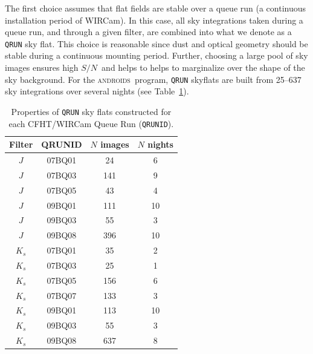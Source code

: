 \documentclass[iop]{emulateapj}
\newcommand{\sn}{\ensuremath{S/N}} %
\newcommand{\androids}{\textsc{androids}}
\newcommand{\Tab}[1]{Table~\ref{tab:#1}}  %
\begin{document}
The first choice assumes that flat fields are stable over a queue run (a continuous installation period of WIRCam).
In this case, all sky integrations taken during a queue run, and through a given filter, are combined into what we denote as a \texttt{QRUN} sky flat.
This choice is reasonable since dust and optical geometry should be stable during a continuous mounting period.
Further, choosing a large pool of sky images ensures high \sn\, and helps to helps to marginalize over the shape of the sky background.
For the \androids\ program, \texttt{QRUN} skyflats are built from 25--637 sky integrations over several nights (see \Tab{qrunflattable}).

\begin{table}[t]
\centering
\caption{Properties of \texttt{QRUN} sky flats constructed for each CFHT/WIRCam Queue Run (\texttt{QRUNID}).}
\label{tab:qrunflattable}

\begin{tabular}{cccc}
\hline
Filter & QRUNID & $N$ images & $N$ nights \\
\hline
$J$ & 07BQ01 & 24 & 6 \\
$J$ & 07BQ03 & 141 & 9 \\
$J$ & 07BQ05 & 43 & 4 \\
$J$ & 09BQ01 & 111 & 10 \\
$J$ & 09BQ03 & 55 & 3 \\
$J$ & 09BQ08 & 396 & 10 \\
\hline
$K_s$ & 07BQ01 & 35 & 2 \\
$K_s$ & 07BQ03 & 25 & 1 \\
$K_s$ & 07BQ05 & 156 & 6 \\
$K_s$ & 07BQ07 & 133 & 3 \\
$K_s$ & 09BQ01 & 113 & 10 \\
$K_s$ & 09BQ03 & 55 & 3 \\
$K_s$ & 09BQ08 & 637 & 8 \\
\hline
\end{tabular}
\end{table}
\end{document}
